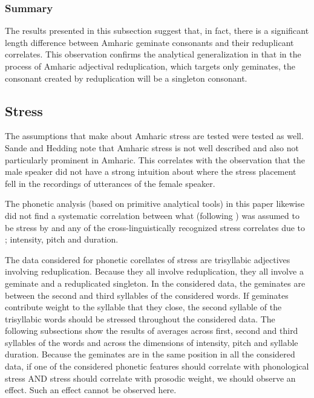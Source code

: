 \documentclass[12pt]{article}
\begin{document}
\subsubsection{Summary}

The results presented in this subsection suggest that, in fact, there is a significant length difference between Amharic geminate consonants and their reduplicant correlates. This observation confirms the analytical generalization in \cite{sande2017} that in the process of Amharic adjectival reduplication, which targets only geminates, the consonant created by reduplication will be a singleton consonant.



\subsection{Stress}

The assumptions that \cite{sande2017} make about Amharic stress are tested were tested as well. Sande and Hedding note that Amharic stress is not well described and also not particularly prominent in Amharic. This correlates with the observation that the male speaker did not have a strong intuition about where the stress placement fell in the recordings of utterances of the female speaker.


The phonetic analysis (based on primitive analytical tools) in this paper likewise did not find a systematic correlation between what (following \cite{leslau-amharic-grammar}) was assumed to be stress by \cite{sande2017} and any of the cross-linguistically recognized stress correlates due to \cite{hayes1995}; intensity, pitch and duration.

The data considered for phonetic corellates of stress are trisyllabic adjectives involving reduplication. Because they all involve reduplication, they all involve a geminate and a reduplicated singleton. In the considered data, the geminates are between the second and third syllables of the considered words. If geminates contribute weight to the syllable that they close, the second syllable of the trisyllabic words should be stressed throughout the considered data. The following subsections show the results of averages across first, second and third syllables of the words and across the dimensions of intensity, pitch and syllable duration.%
Because the geminates are in the same position in all the considered data, if one of the considered phonetic features should correlate with phonological stress AND stress should correlate with prosodic weight, we should observe an effect. Such an effect cannot be observed here.
\end{document}
